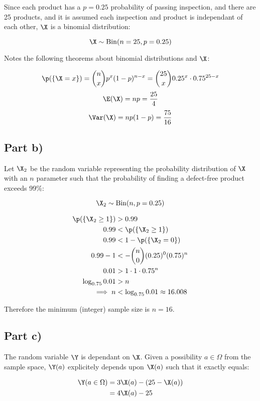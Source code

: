 Since each product has a $p = 0.25$ probability of passing inspection, and there are 25 products, and it is assumed each inspection and product is independant of each other, $\X$ is a binomial distribution:

\[
\X \sim \mathrm{Bin}(n = 25, p = 0.25)
\]

Notes the following theorems about binomial distributions and $\X$:

\[
\p(\{ \X = x \}) = {n \choose x}p^x (1-p)^{n - x} = {25 \choose x}0.25^x \cdot 0.75^{25 - x}
\]
\[
\E(\X) = np = \frac{25}{4}
\]
\[
\Var(\X) = np(1-p) = \frac{75}{16}
\]

\subsection*{Part b)}

Let $\X_2$ be the random variable representing the probability distribution of $\X$ with an $n$ parameter
such that the probability of finding a defect-free product exceeds 99\%:


\[
\X_2 \sim \mathrm{Bin}(n, p = 0.25)
\]

\begin{align*}
\p(\{\X_2 \geq 1\}) &> 0.99 \\
0.99 &< \p(\{ \X_2 \geq 1 \}) \\
0.99 &< 1 - \p(\{ \X_2 = 0 \}) \\
0.99 - 1 &< - {n \choose 0}(0.25)^0(0.75)^n \\
0.01 &> 1 \cdot 1 \cdot 0.75^n \\
\log _{0.75} 0.01 &> n \\
\implies n &< \log _{0.75} 0.01 \approx 16.008
\end{align*}

Therefore the minimum (integer) sample size is $n = 16$.

\subsection*{Part c)}

The random variable $\Y$ is dependant on $\X$.
Given a possibility $a \in \Omega$ from the sample space, $\Y(a)$ explicitely depends upon $\X(a)$ such that it exactly equals:

\begin{align*}
\Y(a \in \Omega) &= 3\X(a) - (25 - \X(a)) \\
&= 4\X(a) - 25
\end{align*}

